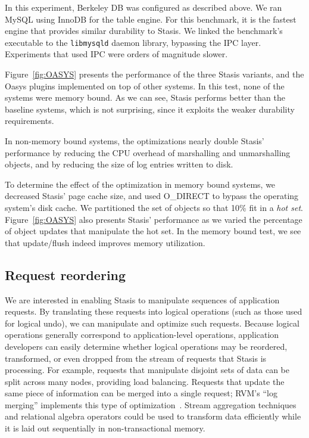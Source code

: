 \documentclass[letterpaper,twocolumn,10pt]{article}
\newcommand{\yad}{Stasis\xspace}
\newcommand{\yads}{Stasis'\xspace}
\newcommand{\oasys}{Oasys\xspace}
\begin{document}
In this experiment, Berkeley DB was configured as described above.  We
ran MySQL using InnoDB for the table engine.  For this benchmark, it
is the fastest engine that provides similar durability to \yad. We
linked the benchmark's executable to the {\tt libmysqld} daemon library,
bypassing the IPC layer. Experiments that used IPC were orders of magnitude slower.

Figure~\ref{fig:OASYS} presents the performance of the three \yad
variants, and the \oasys plugins implemented on top of other
systems.  In this test, none of the systems were memory bound.  As
we can see, \yad performs better than the baseline systems, which is
not surprising, since it exploits the weaker durability requirements.

In non-memory bound systems, the optimizations nearly double \yads
performance by reducing the CPU overhead of marshalling and
unmarshalling objects, and by reducing the size of log entries written
to disk.

To determine the effect of the optimization in memory bound systems,
we decreased \yads page cache size, and used O\_DIRECT to bypass the
operating system's disk cache.  We partitioned the set of objects
so that 10\% fit in a {\em hot set}.
Figure~\ref{fig:OASYS} also presents \yads performance as we varied the
percentage of object updates that manipulate the hot set.  In the
memory bound test, we see that update/flush indeed improves memory
utilization.

\subsection{Request reordering}

We are interested in enabling \yad to manipulate sequences of
application requests.  By translating these requests into logical
operations (such as those used for logical undo),  we can 
manipulate and optimize such requests.  Because logical operations generally
correspond to application-level operations, application developers can easily determine whether
logical operations may be reordered, transformed, or even dropped from
the stream of requests that \yad is processing.  For example,
requests that manipulate disjoint sets of data can be split across
many nodes, providing load balancing.  Requests that update the same piece of information
can be merged into a single request; RVM's ``log merging''
implements this type of optimization~\cite{lrvm}.  Stream aggregation
techniques and relational algebra operators could be used to
 transform data efficiently while it is laid out sequentially in
non-transactional memory.
\end{document}

